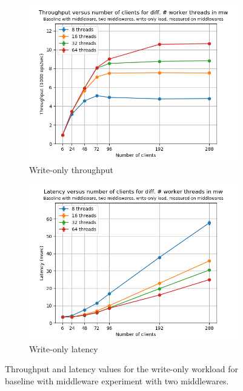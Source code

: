 \documentclass[11pt,a4paper]{article}
\begin{document}
\begin{figure}[h]
\centering
\begin{subfigure}{.5\textwidth}
  \centering
  \includegraphics[width=1.0\linewidth,trim={0px 0px 0px 0px},clip]{img/plot/mwb2-wo-tp_mw.png}
  \caption{Write-only throughput}
  \label{fig:mwb2-wo-tp_mw}
\end{subfigure}%
\begin{subfigure}{.5\textwidth}
  \centering
  \includegraphics[width=1.0\linewidth,trim={0px 0px 0px 0px},clip]{img/plot/mwb2-wo-lat_mw}
  \caption{Write-only latency}
  \label{fig:mwb2-wo-lat_mw}
\end{subfigure}
\caption{Throughput and latency values for the write-only workload for baseline with middleware experiment with two middlewares.}
\label{fig:mwb2-wo_mw}
\end{figure}
\end{document}

